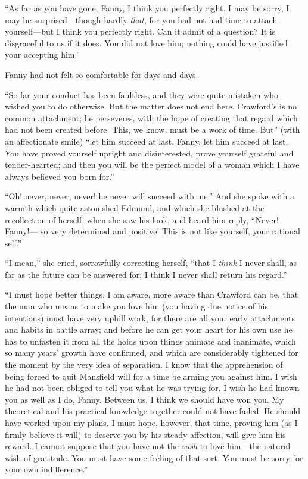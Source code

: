 ``As far as you have gone, Fanny, I think you perfectly right.
I may be sorry, I may be surprised---though hardly \emph{that},
for you had not had time to attach yourself---but I think
you perfectly right.  Can it admit of a question?
It is disgraceful to us if it does.  You did not love him;
nothing could have justified your accepting him.''

Fanny had not felt so comfortable for days and days.

``So far your conduct has been faultless, and they were quite
mistaken who wished you to do otherwise.  But the matter
does not end here.  Crawford's is no common attachment;
he perseveres, with the hope of creating that regard
which had not been created before.  This, we know,
must be a work of time.  But'' (with an affectionate smile)
``let him succeed at last, Fanny, let him succeed at last.
You have proved yourself upright and disinterested,
prove yourself grateful and tender-hearted; and then you
will be the perfect model of a woman which I have always
believed you born for.''

``Oh! never, never, never! he never will succeed with me.''
And she spoke with a warmth which quite astonished Edmund,
and which she blushed at the recollection of herself,
when she saw his look, and heard him reply, ``Never!  Fanny!---%
so very determined and positive!  This is not like yourself,
your rational self.''

``I mean,'' she cried, sorrowfully correcting herself,
``that I \emph{think} I never shall, as far as the future can
be answered for; I think I never shall return his regard.''

``I must hope better things.  I am aware, more aware
than Crawford can be, that the man who means to make
you love him (you having due notice of his intentions)
must have very uphill work, for there are all your early
attachments and habits in battle array; and before he
can get your heart for his own use he has to unfasten it
from all the holds upon things animate and inanimate,
which so many years' growth have confirmed, and which are
considerably tightened for the moment by the very idea
of separation.  I know that the apprehension of being
forced to quit Mansfield will for a time be arming you
against him.  I wish he had not been obliged to tell you
what he was trying for.  I wish he had known you as well as
I do, Fanny.  Between us, I think we should have won you.
My theoretical and his practical knowledge together could
not have failed.  He should have worked upon my plans.
I must hope, however, that time, proving him (as I firmly
believe it will) to deserve you by his steady affection,
will give him his reward.  I cannot suppose that you have
not the \emph{wish} to love him---the natural wish of gratitude.
You must have some feeling of that sort.  You must be sorry
for your own indifference.''

